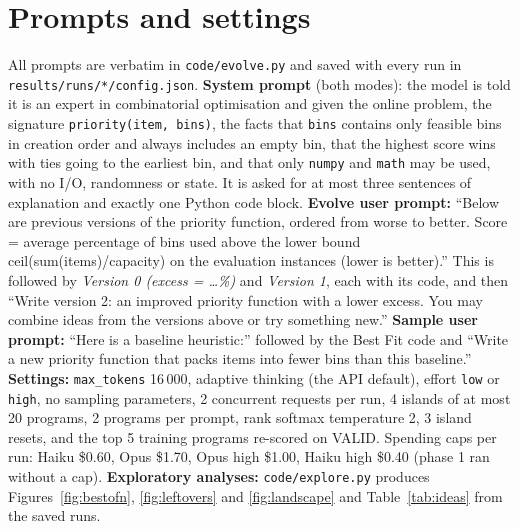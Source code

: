 \documentclass[10pt]{article}
\begin{document}



\appendix
\section{Prompts and settings}\label{app:prompts}
All prompts are verbatim in \texttt{code/evolve.py} and saved with every run in
\texttt{results/runs/*/config.json}. \textbf{System prompt} (both modes): the model is told it is an
expert in combinatorial optimisation and given the online problem, the signature
\texttt{priority(item, bins)}, the facts that \texttt{bins} contains only feasible bins in creation
order and always includes an empty bin, that the highest score wins with ties going to the earliest
bin, and that only \texttt{numpy} and \texttt{math} may be used, with no I/O, randomness or state. It
is asked for at most three sentences of explanation and exactly one Python code block.
\textbf{Evolve user prompt:} ``Below are previous versions of the priority function, ordered from
worse to better. Score = average percentage of bins used above the lower bound
ceil(sum(items)/capacity) on the evaluation instances (lower is better).'' This is followed by
\emph{Version 0 (excess = \ldots\%)} and \emph{Version 1}, each with its code, and then ``Write
version 2: an improved priority function with a lower excess. You may combine ideas from the
versions above or try something new.'' \textbf{Sample user prompt:} ``Here is a baseline
heuristic:'' followed by the Best Fit code and ``Write a new priority function that packs items into
fewer bins than this baseline.'' \textbf{Settings:} \texttt{max\_tokens} 16\,000, adaptive thinking
(the API default), effort \texttt{low} or \texttt{high}, no sampling parameters, 2 concurrent
requests per run, 4 islands of at most 20 programs, 2 programs per prompt, rank softmax temperature
2, 3 island resets, and the top 5 training programs re-scored on VALID. Spending caps per run: Haiku
\$0.60, Opus \$1.70, Opus high \$1.00, Haiku high \$0.40 (phase 1 ran without a cap).
\textbf{Exploratory analyses:} \texttt{code/explore.py} produces Figures~\ref{fig:bestofn},
\ref{fig:leftovers} and \ref{fig:landscape} and Table~\ref{tab:ideas} from the saved runs.
\end{document}
